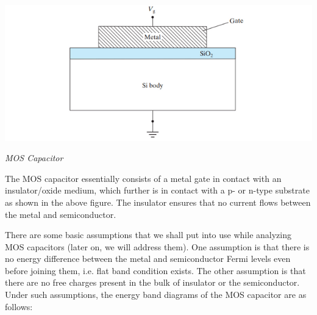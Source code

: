 \documentclass[12 pt]{article}
\begin{document}
\par
\begin{center}
    \includegraphics{MOS_capacitor_2.png}
\end{center}
\begin{center}
    \emph{\hspace{2.75 cm}MOS Capacitor\newline}
\end{center}
\par

The MOS capacitor essentially consists of a metal gate in contact with an insulator/oxide medium, which further is in contact with a p- or n-type substrate as shown in the above figure. The insulator ensures that no current flows between the metal and semiconductor. \par

There are some basic assumptions that we shall put into use while analyzing MOS capacitors (later on, we will address them). One assumption is that there is no energy difference between the metal and semiconductor Fermi levels even before joining them, i.e. flat band condition exists. The other assumption is that there are no free charges present in the bulk of insulator or the semiconductor. Under such assumptions, the energy band diagrams of the MOS capacitor are as follows: \newline
\end{document}
